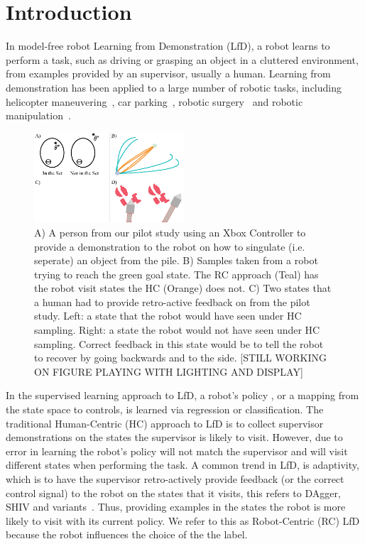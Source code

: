 \documentclass[10pt, conference]{ieeeconf}      %
\begin{document}
\section{Introduction} 
In model-free robot Learning from Demonstration (LfD), a robot learns to perform a task, such as driving or grasping an object in a cluttered environment, from examples provided by an supervisor, usually a human. Learning from demonstration has been applied to a large number of robotic tasks, including helicopter maneuvering~\cite{abbeel2007application}, car parking~\cite{abbeel2008apprenticeship}, robotic surgery~\cite{van2010superhuman,laskeyshiv} and robotic manipulation~\cite{laskeyrobot}. 

\begin{figure}
\center
\includegraphics[width=0.5\textwidth]{f_figs/teaser.eps}
\caption{
    \footnotesize
 A) A person from our pilot study using an Xbox Controller to provide a demonstration to the robot on how to singulate (i.e. seperate) an object from the pile.  B) Samples taken from a robot trying to reach the green goal state. The RC approach (Teal) has the robot visit states the HC (Orange) does not. C) Two states that a human had to provide retro-active feedback on from the pilot study. Left: a state that the robot would have seen under HC sampling. Right: a state the robot would not have seen under HC sampling. Correct feedback in this state would be to tell the robot to recover by going backwards and to the side. [STILL WORKING ON FIGURE PLAYING WITH LIGHTING AND DISPLAY]}
\vspace*{-20pt}
\label{fig:teaserl}
\end{figure}


In the supervised learning approach to LfD, a robot's policy , or a mapping from the state space to controls, is learned via regression or classification. The traditional Human-Centric (HC) approach to LfD is to collect supervisor demonstrations on the states the supervisor is likely to visit. However, due to error in learning the robot's policy will not match the supervisor and will visit different states when performing the task. A common trend in LfD, is adaptivity, which is to have the supervisor retro-actively provide feedback (or the correct control signal) to the robot on the states that it visits, this refers to DAgger, SHIV and variants~\cite{ross2010efficient,ross2010reduction,laskeyrobot,laskeyshiv,he2012imitation}.
Thus, providing examples in the states the robot is more likely to visit with its current policy. We refer to this as Robot-Centric (RC) LfD because the robot influences the choice of the the label. 
\end{document}
